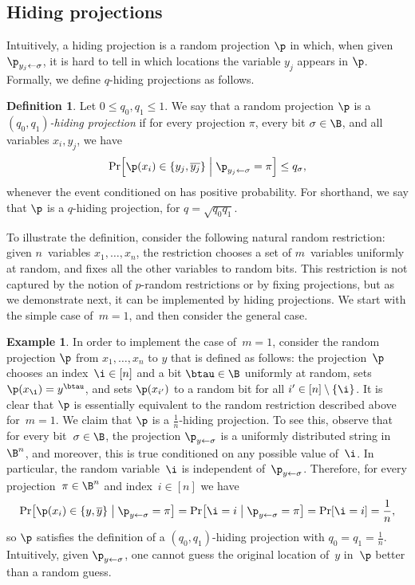 \documentclass[11pt]{article}
\numberwithin{equation}{section}
\theoremstyle{definition}
\newtheorem{definition}[theorem]{Definition}
\newtheorem{example}[theorem]{Example}
\theoremstyle{plain}
\theoremstyle{definition}\newtheorem{notation}[theorem]{Notation}\theoremstyle{plain}
\begin{document}
\subsection{\label{subsec:Hiding-projections}Hiding projections}

Intuitively, a hiding projection is a random projection $\p$ in which,
when given $\p_{y_{j}\gets\sigma}$, it is hard to tell in which locations
the variable $y_{j}$ appears in $\p$. Formally, we define $q$-hiding
projections as follows. 
\begin{definition}
\label{def:hiding-projections}Let $0\leq q_{0},q_{1}\leq1$. We say that
a random projection $\p$ is a \emph{$(q_{0},q_{1})$-hiding projection}
if for every projection $\pi$, every bit $\sigma\in\B$, and all
variables $x_{i},y_{j}$, we have 
\[
\Pr\!\left[\p(x_{i})\in\left\{ y_{j},\overline{y_{j}}\right\} \;\middle|\;\p_{y_{j}\gets\sigma}=\pi\right]\leq q_{\sigma},
\]
whenever the event conditioned on has positive probability. For shorthand,
we say that $\p$ is a $q$-hiding projection, for $q=\sqrt{q_{0}q_{1}}$. 
\end{definition}

\noindent To illustrate the definition, consider the following natural
random restriction: given $n$~variables $x_{1},\ldots,x_{n}$, the
restriction chooses a set of $m$~variables uniformly at random,
and fixes all the other variables to random bits. This restriction
is not captured by the notion of $p$-random restrictions or by fixing
projections, but as we demonstrate next, it can be implemented by
hiding projections. We start with the simple case of~$m=1$, and
then consider the general case. 
\begin{example}
\label{ex:random-edge}In order to implement the case of~$m=1$, consider
the random projection $\p$ from $x_{1},\ldots,x_{n}$ to $y$ that
is defined as follows: the projection~$\p$ chooses an index~$\i\in\left[n\right]$
and a bit $\btau\in\B$ uniformly at random, sets $\p(x_{\i})=y^{\btau}$,
and sets $\p(x_{i'})$ to a random bit for all $i'\in\left[n\right]\setminus\left\{ \i\right\} $.
It is clear that $\p$ is essentially equivalent to the random restriction
described above for~$m=1$. We claim that $\p$ is a $\frac{1}{n}$-hiding
projection. To see this, observe that for every bit~$\sigma\in\B$,
the projection $\p_{y\gets\sigma}$ is a uniformly distributed string
in~$\B^{n}$, and moreover, this is true conditioned on any possible
value of~$\i$. In particular, the random variable~$\i$ is independent
of~$\p_{y\gets\sigma}$. Therefore, for every projection~$\pi\in\B^{n}$
and index~$i\in\left[n\right]$ we have 
\[
\Pr\!\left[\p(x_{i})\in\left\{ y,\overline{y}\right\} \;\middle|\;\p_{y\gets\sigma}=\pi\right]=\Pr\!\left[\i=i\;\middle|\;\p_{y\gets\sigma}=\pi\right]=\Pr\!\left[\i=i\right]=\frac{1}{n},
\]
so $\p$ satisfies the definition of a $(q_{0},q_{1})$-hiding projection
with $q_{0}=q_{1}=\frac{1}{n}$. Intuitively, given $\p_{y\gets\sigma}$,
one cannot guess the original location of~$y$ in~$\p$ better than
a random guess.
\end{example}
\end{document}
